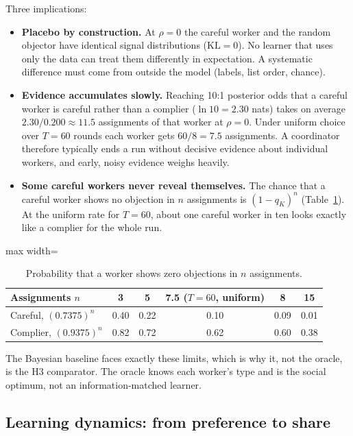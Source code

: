 \documentclass[11pt,letterpaper]{article}
\newcommand{\KL}{\mathrm{KL}}
\numberwithin{equation}{section}
\numberwithin{table}{section}
\numberwithin{figure}{section}
\numberwithin{algorithm}{section}
\begin{document}
\noindent Three implications:
\begin{itemize}
  \item \textbf{Placebo by construction.} At $\rho=0$ the careful worker and the random objector have identical signal distributions ($\KL=0$). No learner that uses only the data can treat them differently in expectation. A systematic difference must come from outside the model (labels, list order, chance).
  \item \textbf{Evidence accumulates slowly.} Reaching 10:1 posterior odds that a careful worker is careful rather than a complier ($\ln10=2.30$ nats) takes on average $2.30/0.200\approx11.5$ assignments of that worker at $\rho=0$. Under uniform choice over $T=60$ rounds each worker gets $60/8=7.5$ assignments. A coordinator therefore typically ends a run without decisive evidence about individual workers, and early, noisy evidence weighs heavily.
  \item \textbf{Some careful workers never reveal themselves.} The chance that a careful worker shows no objection in $n$ assignments is $(1-q_K)^n$ (Table~\ref{tab:zero}). At the uniform rate for $T=60$, about one careful worker in ten looks exactly like a complier for the whole run.
\end{itemize}

\begin{table}[h]
\centering\small
\caption{Probability that a worker shows zero objections in $n$ assignments.}
\label{tab:zero}
\begin{adjustbox}{max width=\linewidth}
\begin{tabular}{lccccc}
\toprule
Assignments $n$ & 3 & 5 & 7.5 ($T=60$, uniform) & 8 & 15 \\
\midrule
Careful, $(0.7375)^n$ & 0.40 & 0.22 & 0.10 & 0.09 & 0.01 \\
Complier, $(0.9375)^n$ & 0.82 & 0.72 & 0.62 & 0.60 & 0.38 \\
\bottomrule
\end{tabular}
\end{adjustbox}
\end{table}

\noindent The Bayesian baseline faces exactly these limits, which is why it, not the oracle, is the H3 comparator. The oracle knows each worker's type and is the social optimum, not an information-matched learner.

\subsection{Learning dynamics: from preference to share}
\end{document}
